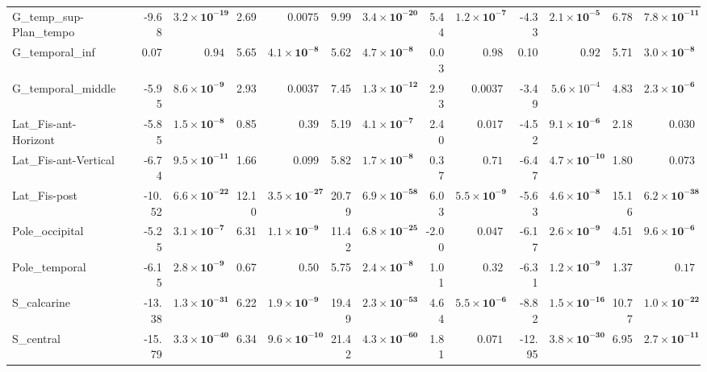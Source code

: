 {\begin{longtable}{llrrrrrrrrrrrr}
G\_temp\_sup-Plan\_tempo &  & -9.68 & $\mathbf{3.2{\times}10^{-19}}$ & 2.69 & $0.0075$ & 9.99 & $\mathbf{3.4{\times}10^{-20}}$ & 5.44 & $\mathbf{1.2{\times}10^{-7}}$ & -4.33 & $\mathbf{2.1{\times}10^{-5}}$ & 6.78 & $\mathbf{7.8{\times}10^{-11}}$ \\
G\_temporal\_inf &  & 0.07 & $0.94$ & 5.65 & $\mathbf{4.1{\times}10^{-8}}$ & 5.62 & $\mathbf{4.7{\times}10^{-8}}$ & 0.03 & $0.98$ & 0.10 & $0.92$ & 5.71 & $\mathbf{3.0{\times}10^{-8}}$ \\
G\_temporal\_middle &  & -5.95 & $\mathbf{8.6{\times}10^{-9}}$ & 2.93 & $0.0037$ & 7.45 & $\mathbf{1.3{\times}10^{-12}}$ & 2.93 & $0.0037$ & -3.49 & $5.6{\times}10^{-4}$ & 4.83 & $\mathbf{2.3{\times}10^{-6}}$ \\
Lat\_Fis-ant-Horizont &  & -5.85 & $\mathbf{1.5{\times}10^{-8}}$ & 0.85 & $0.39$ & 5.19 & $\mathbf{4.1{\times}10^{-7}}$ & 2.40 & $0.017$ & -4.52 & $\mathbf{9.1{\times}10^{-6}}$ & 2.18 & $0.030$ \\
Lat\_Fis-ant-Vertical &  & -6.74 & $\mathbf{9.5{\times}10^{-11}}$ & 1.66 & $0.099$ & 5.82 & $\mathbf{1.7{\times}10^{-8}}$ & 0.37 & $0.71$ & -6.47 & $\mathbf{4.7{\times}10^{-10}}$ & 1.80 & $0.073$ \\
Lat\_Fis-post &  & -10.52 & $\mathbf{6.6{\times}10^{-22}}$ & 12.10 & $\mathbf{3.5{\times}10^{-27}}$ & 20.79 & $\mathbf{6.9{\times}10^{-58}}$ & 6.03 & $\mathbf{5.5{\times}10^{-9}}$ & -5.63 & $\mathbf{4.6{\times}10^{-8}}$ & 15.16 & $\mathbf{6.2{\times}10^{-38}}$ \\
Pole\_occipital &  & -5.25 & $\mathbf{3.1{\times}10^{-7}}$ & 6.31 & $\mathbf{1.1{\times}10^{-9}}$ & 11.42 & $\mathbf{6.8{\times}10^{-25}}$ & -2.00 & $0.047$ & -6.17 & $\mathbf{2.6{\times}10^{-9}}$ & 4.51 & $\mathbf{9.6{\times}10^{-6}}$ \\
Pole\_temporal &  & -6.15 & $\mathbf{2.8{\times}10^{-9}}$ & 0.67 & $0.50$ & 5.75 & $\mathbf{2.4{\times}10^{-8}}$ & 1.01 & $0.32$ & -6.31 & $\mathbf{1.2{\times}10^{-9}}$ & 1.37 & $0.17$ \\
S\_calcarine &  & -13.38 & $\mathbf{1.3{\times}10^{-31}}$ & 6.22 & $\mathbf{1.9{\times}10^{-9}}$ & 19.49 & $\mathbf{2.3{\times}10^{-53}}$ & 4.64 & $\mathbf{5.5{\times}10^{-6}}$ & -8.82 & $\mathbf{1.5{\times}10^{-16}}$ & 10.77 & $\mathbf{1.0{\times}10^{-22}}$ \\
S\_central &  & -15.79 & $\mathbf{3.3{\times}10^{-40}}$ & 6.34 & $\mathbf{9.6{\times}10^{-10}}$ & 21.42 & $\mathbf{4.3{\times}10^{-60}}$ & 1.81 & $0.071$ & -12.95 & $\mathbf{3.8{\times}10^{-30}}$ & 6.95 & $\mathbf{2.7{\times}10^{-11}}$ \\

\end{longtable}}
